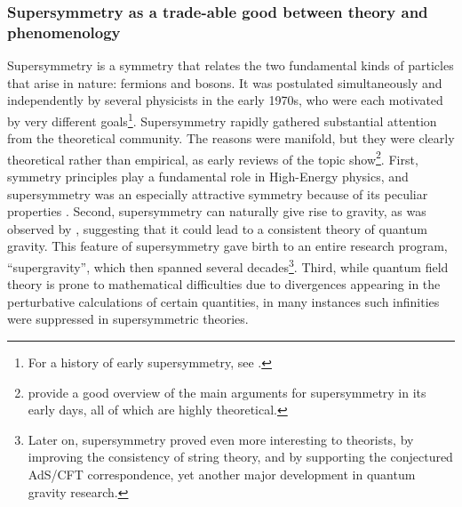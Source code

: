 \documentclass[smallextended]{svjour3}
\begin{document}
\subsubsection{Supersymmetry as a trade-able good between theory and phenomenology}

Supersymmetry is a symmetry that relates the two fundamental kinds of particles that arise in nature: fermions and bosons. It was postulated simultaneously and independently by several physicists in the early 1970s, who were each motivated by very different goals\footnote{%
For a history of early supersymmetry, see \citealt{kane2000the}.}. Supersymmetry rapidly gathered substantial attention from the theoretical community. The reasons were manifold, but they were clearly theoretical rather than empirical, as early reviews of the topic show\footnote{\citealt{Fayet1976cr,Freedman1978zi,Taylor1983su} provide a good overview of the main arguments for supersymmetry in its early days, all of which are highly theoretical.}. First, symmetry principles play a fundamental role in High-Energy physics, and supersymmetry was an especially attractive symmetry because of its peculiar properties%
. Second, supersymmetry can naturally give rise to gravity, as was observed by \citet{Volkov1973}, suggesting that it could lead to a consistent theory of quantum gravity. This feature of supersymmetry gave birth to an entire research program, ``supergravity'', which then spanned several decades\footnote{Later on, supersymmetry proved even more interesting to theorists, by improving the consistency of string theory, and by supporting the conjectured AdS/CFT correspondence, yet another major development in quantum gravity research.}. Third, while quantum field theory is prone to mathematical difficulties due to divergences appearing in the perturbative calculations of certain quantities, in many instances such infinities were suppressed in supersymmetric theories.%
\end{document}
